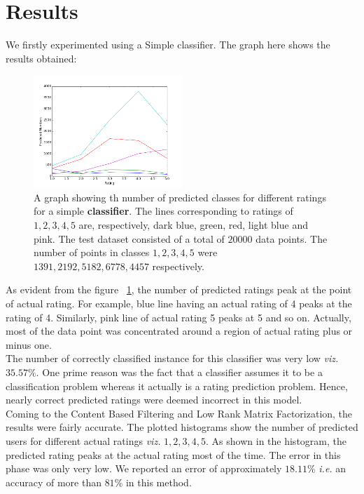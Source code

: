 \documentclass[twocolumn]{article}
\begin{document}
\section*{Results}
We firstly experimented using a Simple classifier. The graph here shows the results obtained:
\begin{figure}
\centering
\includegraphics[width=0.5\textwidth]{figure_1.png}
\caption{A graph showing th number of predicted classes for different ratings for a simple \textbf{classifier}. The lines corresponding to ratings of $1,2,3,4,5$ are, respectively, dark blue, green, red, light blue and pink. The test dataset consisted of a total of $20000$ data points. The number of points in classes $1,2,3,4,5$ were $1391, 2192, 5182, 6778, 4457$ respectively.}
\label{fig:classifier}
\end{figure}
As evident from the figure ~\ref{fig:classifier}, the number of predicted ratings peak at the point of actual rating. For example, blue line having an actual rating of 4 peaks at the rating of 4. Similarly, pink line of actual rating 5 peaks at 5 and so on. Actually, most of the data point was concentrated around a region of actual rating plus or minus one.\\
\newline
The number of correctly classified instance for this classifier was very low \emph{viz.} $35.57 \%$. One prime reason was the fact that a classifier assumes it to be a classification problem whereas it actually is a rating prediction problem. Hence, nearly correct predicted ratings were deemed incorrect in this model.\\
\newline
Coming to the Content Based Filtering and Low Rank Matrix Factorization, the results were fairly accurate. The plotted histograms show the number of predicted users for different actual ratings \emph{viz.} $1,2,3,4,5$. As shown in the histogram, the predicted rating peaks at the actual rating most of the time. The error in this phase was only very low. We reported an error of approximately $18.11 \%$ \emph{i.e.} an accuracy of more than $81 \%$ in this method.\\
\end{document}

